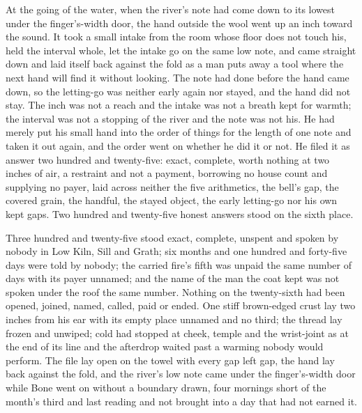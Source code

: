 At the going of the water, when the river's note had come down to its lowest under the finger's-width door, the hand outside the wool went up an inch toward the sound. It took a small intake from the room whose floor does not touch his, held the interval whole, let the intake go on the same low note, and came straight down and laid itself back against the fold as a man puts away a tool where the next hand will find it without looking. The note had done before the hand came down, so the letting-go was neither early again nor stayed, and the hand did not stay. The inch was not a reach and the intake was not a breath kept for warmth; the interval was not a stopping of the river and the note was not his. He had merely put his small hand into the order of things for the length of one note and taken it out again, and the order went on whether he did it or not. He filed it as answer two hundred and twenty-five: exact, complete, worth nothing at two inches of air, a restraint and not a payment, borrowing no house count and supplying no payer, laid across neither the five arithmetics, the bell's gap, the covered grain, the handful, the stayed object, the early letting-go nor his own kept gaps. Two hundred and twenty-five honest answers stood on the sixth place.

Three hundred and twenty-five stood exact, complete, unspent and spoken by nobody in Low Kiln, Sill and Grath; six months and one hundred and forty-five days were told by nobody; the carried fire's fifth was unpaid the same number of days with its payer unnamed; and the name of the man the coat kept was not spoken under the roof the same number. Nothing on the twenty-sixth had been opened, joined, named, called, paid or ended. One stiff brown-edged crust lay two inches from his ear with its empty place unnamed and no third; the thread lay frozen and unwiped; cold had stopped at cheek, temple and the wrist-joint as at the end of its line and the afterdrop waited past a warming nobody would perform. The file lay open on the towel with every gap left gap, the hand lay back against the fold, and the river's low note came under the finger's-width door while Bone went on without a boundary drawn, four mornings short of the month's third and last reading and not brought into a day that had not earned it.
